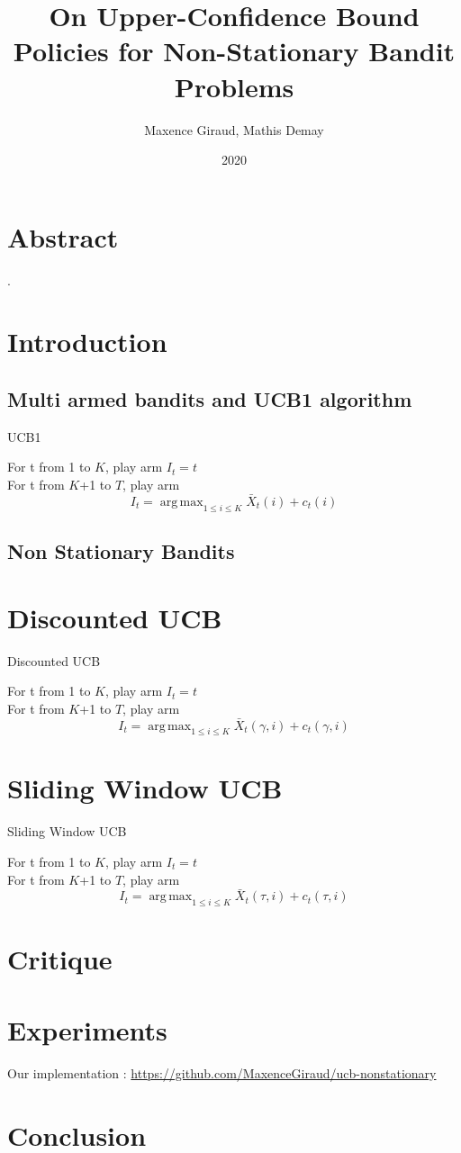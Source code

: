 \documentclass{article}
\title{On Upper-Confidence Bound Policies for Non-Stationary Bandit Problems}
\author{Maxence Giraud, Mathis Demay}
\date{2020}
\DeclareMathOperator*{\argmax}{arg\,max}
\begin{document}
\maketitle

\section*{Abstract}
\cite{garivier2008upperconfidence}.

\section{Introduction}

\subsection{Multi armed bandits and UCB1 algorithm}

\begin{algorithm}
    \caption{UCB1}
    For t from 1 to $K$, play arm $I_t = t$ \\
    For t from $K$+1 to $T$, play arm 
    $$ I_t = \argmax_{1\leq i \leq K} \bar X_t(i) + c_t(i)$$

\end{algorithm}

\subsection{Non Stationary Bandits}

\section{Discounted UCB}

\begin{algorithm}
    \caption{Discounted UCB}
    For t from 1 to $K$, play arm $I_t = t$ \\
    For t from $K$+1 to $T$, play arm 
    $$ I_t = \argmax_{1\leq i \leq K} \bar X_t(\gamma,i) + c_t(\gamma,i)$$

\end{algorithm}

\section{Sliding Window UCB}

\begin{algorithm}
    \caption{Sliding Window UCB}
    For t from 1 to $K$, play arm $I_t = t$ \\
    For t from $K$+1 to $T$, play arm 
    $$ I_t = \argmax_{1\leq i \leq K} \bar X_t(\tau,i) + c_t(\tau,i)$$

\end{algorithm}

\section{Critique}

\section{Experiments}
Our implementation : \url{https://github.com/MaxenceGiraud/ucb-nonstationary} 

\section{Conclusion}


\end{document}

